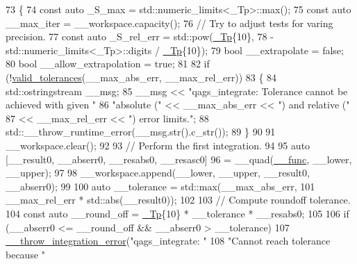 \begin{DoxyCode}
73     \{
74       \textcolor{keyword}{const} \textcolor{keyword}{auto} \_S\_max = std::numeric\_limits<\_Tp>::max();
75       \textcolor{keyword}{const} \textcolor{keyword}{auto} \_\_max\_iter = \_\_workspace.capacity();
76       \textcolor{comment}{// Try to adjust tests for varing precision.}
77       \textcolor{keyword}{const} \textcolor{keyword}{auto} \_S\_rel\_err = std::pow(\hyperlink{namespace____gnu__cxx_a3b19a9c800ca194374ef9172290f7d79}{\_Tp}\{10\},
78                                  -std::numeric\_limits<\_Tp>::digits / \hyperlink{namespace____gnu__cxx_a3b19a9c800ca194374ef9172290f7d79}{\_Tp}\{10\});
79       \textcolor{keywordtype}{bool} \_\_extrapolate = \textcolor{keyword}{false};
80       \textcolor{keywordtype}{bool} \_\_allow\_extrapolation = \textcolor{keyword}{true};
81 
82       \textcolor{keywordflow}{if} (!\hyperlink{namespace____gnu__cxx_a86b1d89b2e2cb97614fdf3425d3dccd5}{valid\_tolerances}(\_\_max\_abs\_err, \_\_max\_rel\_err))
83         \{
84           std::ostringstream \_\_msg;
85           \_\_msg << \textcolor{stringliteral}{"qags\_integrate: Tolerance cannot be achieved with given "}
86                    \textcolor{stringliteral}{"absolute ("} << \_\_max\_abs\_err << \textcolor{stringliteral}{") and relative ("}
87                 << \_\_max\_rel\_err << \textcolor{stringliteral}{") error limits."};
88           std::\_\_throw\_runtime\_error(\_\_msg.str().c\_str());
89         \}
90 
91       \_\_workspace.clear();
92 
93       \textcolor{comment}{// Perform the first integration.}
94 
95       \textcolor{keyword}{auto} [\_\_result0, \_\_abserr0, \_\_resabs0, \_\_resasc0]
96         = \_\_quad(\hyperlink{namespace____gnu__cxx_af2b2f0c7a2ae72b922b1afefae5a65b2}{\_\_func}, \_\_lower, \_\_upper);
97 
98       \_\_workspace.append(\_\_lower, \_\_upper, \_\_result0, \_\_abserr0);
99 
100       \textcolor{keyword}{auto} \_\_tolerance = std::max(\_\_max\_abs\_err,
101                                   \_\_max\_rel\_err * std::abs(\_\_result0));
102 
103       \textcolor{comment}{// Compute roundoff tolerance.}
104       \textcolor{keyword}{const} \textcolor{keyword}{auto} \_\_round\_off = \hyperlink{namespace____gnu__cxx_a3b19a9c800ca194374ef9172290f7d79}{\_Tp}\{10\} * \_\_tolerance * \_\_resabs0;
105 
106       \textcolor{keywordflow}{if} (\_\_abserr0 <= \_\_round\_off && \_\_abserr0 > \_\_tolerance)
107         \hyperlink{namespace____gnu__cxx_a2ae22137ca092b8ae10f4d42b4e32cfb}{\_\_throw\_integration\_error}(\textcolor{stringliteral}{"qags\_integrate: "}
108                                   \textcolor{stringliteral}{"Cannot reach tolerance because "}

\end{DoxyCode}
